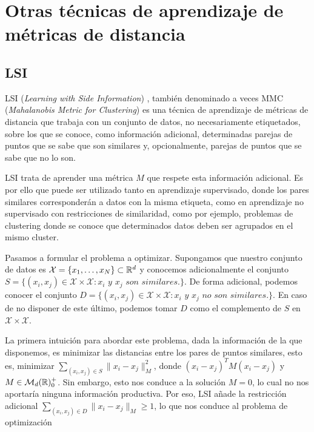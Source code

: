 \documentclass{book}
\begin{document}
\section{Otras técnicas de aprendizaje de métricas de distancia}

\subsection{LSI} \label{lsi}

LSI (\emph{Learning with Side Information}) \cite{lsi}, también denominado a veces MMC (\emph{Mahalanobis Metric for Clustering}) es una técnica de aprendizaje de métricas de distancia que trabaja con un conjunto de datos, no necesariamente etiquetados, sobre los que se conoce, como información adicional, determinadas parejas de puntos que se sabe que son similares y, opcionalmente, parejas de puntos que se sabe que no lo son.

LSI trata de aprender una métrica $M$ que respete esta información adicional. Es por ello que puede ser utilizado tanto en aprendizaje supervisado, donde los pares similares corresponderán a datos con la misma etiqueta, como en aprendizaje no supervisado con restricciones de similaridad, como por ejemplo, problemas de clustering donde se conoce que determinados datos deben ser agrupados en el mismo cluster.

Pasamos a formular el problema a optimizar. Supongamos que nuestro conjunto de datos es $\mathcal{X} = \{x_1,\dots,x_N\} \subset \mathbb{R}^d$ y conocemos adicionalmente el conjunto $S = \{(x_i,x_j) \in \mathcal{X}\times\mathcal{X} \colon x_i \textit{ y } x_j \textit{ son similares.}\}$. De forma adicional, podemos conocer el conjunto $D = \{(x_i,x_j) \in \mathcal{X}\times\mathcal{X} \colon x_i \textit{ y } x_j \textit{ no son similares.} \}$. En caso de no disponer de este último, podemos tomar $D$ como el complemento de $S$ en $\mathcal{X} \times \mathcal{X}$.

La primera intuición para abordar este problema, dada la información de la que disponemos, es minimizar las distancias entre los pares de puntos similares, esto es, minimizar $\sum_{(x_i,x_j)\in S} \|x_i - x_j \|_M^2$, donde $(x_i - x_j)^T M (x_i - x_j)$ y $M \in \mathcal{M}_{d}(\mathbb{R})^+_0$. Sin embargo, esto nos conduce a la solución $M = 0$, lo cual no nos aportaría ninguna información productiva. Por eso, LSI añade la restricción adicional $\sum_{(x_i,x_j) \in D} \|x_i - x_j\|_M \ge 1$, lo que nos conduce al problema de optimización
\end{document}
